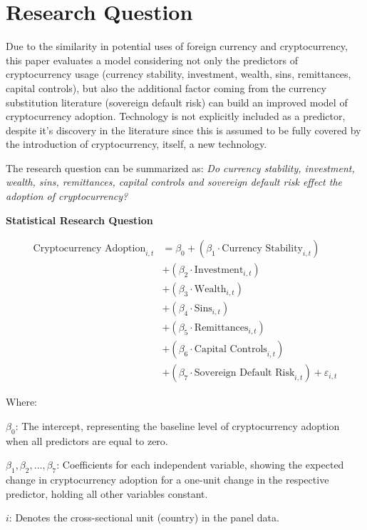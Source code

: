 \documentclass[
]{article}
\begin{document}
\newpage

\section{Research Question}\label{research-question}

Due to the similarity in potential uses of foreign currency and cryptocurrency, this paper evaluates a model considering not only the predictors of cryptocurrency usage (currency stability, investment, wealth, sins, remittances, capital controls), but also the additional factor coming from the currency substitution literature (sovereign default risk) can build an improved model of cryptocurrency adoption. Technology is not explicitly included as a predictor, despite it's discovery in the literature since this is assumed to be fully covered by the introduction of cryptocurrency, itself, a new technology.

The research question can be summarized as: \emph{Do currency stability, investment, wealth, sins, remittances, capital controls and sovereign default risk effect the adoption of cryptocurrency?}

\textbf{Statistical Research Question}

\begin{align*}
\text{Cryptocurrency Adoption}_{i,t} &= \beta_0 + (\beta_1 \cdot \text{Currency Stability}_{i,t}) \\
&+ (\beta_2 \cdot \text{Investment}_{i,t}) \\
&+ (\beta_3 \cdot \text{Wealth}_{i,t}) \\
&+ (\beta_4 \cdot \text{Sins}_{i,t}) \\
&+ (\beta_5 \cdot \text{Remittances}_{i,t}) \\
&+ (\beta_6 \cdot \text{Capital Controls}_{i,t}) \\
&+ (\beta_7 \cdot \text{Sovereign Default Risk}_{i,t}) + \varepsilon_{i,t}
\end{align*}

Where:

\(\beta_0\): The intercept, representing the baseline level of cryptocurrency adoption when all predictors are equal to zero.

\(\beta_1, \beta_2, \dots, \beta_7\): Coefficients for each independent variable, showing the expected change in cryptocurrency adoption for a one-unit change in the respective predictor, holding all other variables constant.

\(i\): Denotes the cross-sectional unit (country) in the panel data.
\end{document}
